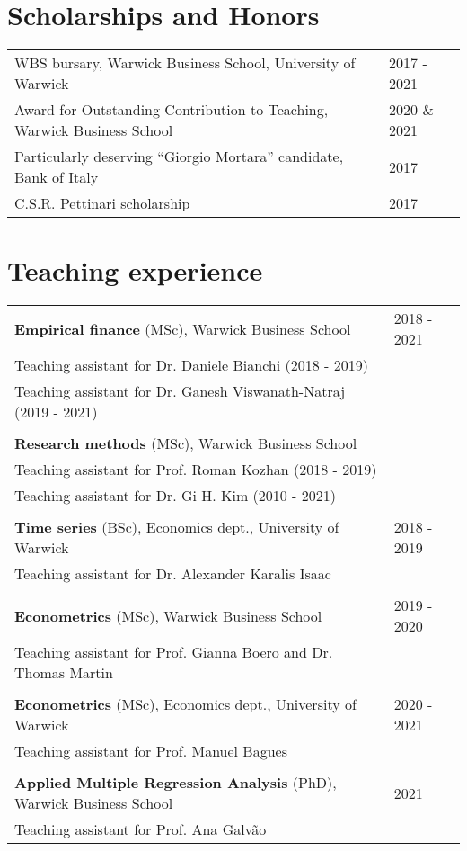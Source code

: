 \documentclass[a4paper,12pt]{article}
\begin{document}
\section{Scholarships and Honors}
\begin{tabular*}{\linewidth}{@{}l@{\extracolsep{\fill}}l}
WBS bursary, Warwick Business School, University of Warwick & 2017 - 2021\\
Award for Outstanding Contribution to Teaching, Warwick Business School & 2020 \& 2021\\
Particularly deserving “Giorgio Mortara” candidate, Bank of Italy & 2017\\
 C.S.R. Pettinari scholarship & 2017\\
\end{tabular*}
\section{Teaching experience}
\begin{tabular*}{\linewidth}{@{}l@{\extracolsep{\fill}}l}
\textbf{Empirical finance} (MSc), Warwick Business School & 2018 - 2021\\[.25em]
\multicolumn{1}{l}{Teaching assistant for Dr. Daniele Bianchi (2018 - 2019)}\\
\multicolumn{1}{l}{Teaching assistant for Dr. Ganesh Viswanath-Natraj (2019 - 2021)}\\
\\[.25em]
\textbf{Research methods} (MSc), Warwick Business School \\[.25em]
\multicolumn{1}{l}{Teaching assistant for Prof. Roman Kozhan (2018 - 2019)}\\
\multicolumn{1}{l}{Teaching assistant for Dr. Gi H. Kim (2010 - 2021)}\\
\\[.25em]
\textbf{Time series} (BSc), Economics dept., University of Warwick & 2018 - 2019 \\[.25em]
\multicolumn{1}{l}{Teaching assistant for Dr. Alexander Karalis Isaac} \\
\\[.25em]
\textbf{Econometrics} (MSc), Warwick Business School & 2019 - 2020\\[.25em]
\multicolumn{1}{l}{Teaching assistant for Prof. Gianna Boero and Dr. Thomas Martin }\\
\\[.25em]
\textbf{Econometrics} (MSc), Economics dept.,  University of Warwick & 2020 - 2021\\[.25em]
\multicolumn{1}{l}{Teaching assistant for Prof. Manuel Bagues}\\
\\[.25em]
\textbf{Applied Multiple Regression Analysis} (PhD), Warwick Business School & 2021\\[.25em]
\multicolumn{1}{l}{Teaching assistant for Prof. Ana Galv\~ao}\\
\end{tabular*}
\end{document}
